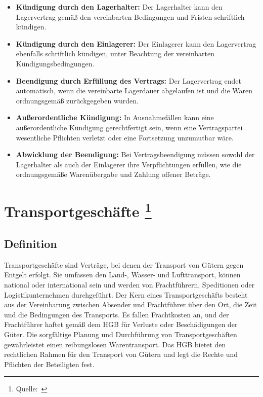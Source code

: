 \begin{itemize}
    \item \textbf{Kündigung durch den Lagerhalter:} Der Lagerhalter kann den Lagervertrag gemäß den vereinbarten Bedingungen und Fristen schriftlich kündigen.
    \item \textbf{Kündigung durch den Einlagerer:} Der Einlagerer kann den Lagervertrag ebenfalls schriftlich kündigen, unter Beachtung der vereinbarten Kündigungsbedingungen.
    \item \textbf{Beendigung durch Erfüllung des Vertrags:} Der Lagervertrag endet automatisch, wenn die vereinbarte Lagerdauer abgelaufen ist und die Waren ordnungsgemäß zurückgegeben wurden.
    \item \textbf{Außerordentliche Kündigung:} In Ausnahmefällen kann eine außerordentliche Kündigung gerechtfertigt sein, wenn eine Vertragspartei wesentliche Pflichten verletzt oder eine Fortsetzung unzumutbar wäre.
    \item \textbf{Abwicklung der Beendigung:} Bei Vertragsbeendigung müssen sowohl der Lagerhalter als auch der Einlagerer ihre Verpflichtungen erfüllen, wie die ordnungsgemäße Warenübergabe und Zahlung offener Beträge.
\end{itemize}





\chapter[Transportgeschäfte]{Transportgeschäfte \footnote{Quelle:~\cite{Handelsrecht}}}

\section{Definition}

Transportgeschäfte sind Verträge, bei denen der Transport von Gütern gegen Entgelt erfolgt. Sie umfassen den Land-, Wasser- und Lufttransport, können national oder international sein und werden von Frachtführern, Speditionen oder Logistikunternehmen durchgeführt. Der Kern eines Transportgeschäfts besteht aus der Vereinbarung zwischen Absender und Frachtführer über den Ort, die Zeit und die Bedingungen des Transports. Es fallen Frachtkosten an, und der Frachtführer haftet gemäß dem HGB für Verluste oder Beschädigungen der Güter. Die sorgfältige Planung und Durchführung von Transportgeschäften gewährleistet einen reibungslosen Warentransport. Das HGB bietet den rechtlichen Rahmen für den Transport von Gütern und legt die Rechte und Pflichten der Beteiligten fest.


